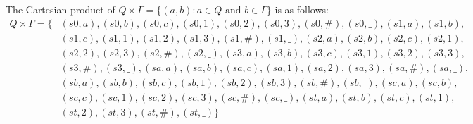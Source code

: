 \documentclass[12pt, a4paper, bibliography=totocnumbered]{report}
\begin{document}
{	The Cartesian product of $Q \times \Gamma = \{(a,b) : a \in Q \text{~and~} b \in \Gamma \}$ is as follows:
		\begin{equation}\label{eq:Q_times_Gamma}
		\begin{aligned}
		Q \times \Gamma = \{ & (s0,a),(s0,b),(s0,c),(s0,1),(s0,2),(s0,3),(s0,\#),(s0,\_),(s1,a),(s1,b),       \\
		                     & (s1,c),(s1,1),(s1,2), (s1,3),(s1,\#),(s1,\_),(s2,a),(s2,b),(s2,c),(s2,1),      \\
		                     & (s2,2),(s2,3),(s2,\#),(s2,\_),(s3,a),(s3,b), (s3,c),(s3,1),(s3,2),(s3,3),      \\
		                     & (s3,\#),(s3,\_),(sa,a),(sa,b),(sa,c),(sa,1),(sa,2),(sa,3),(sa,\#), (sa,\_),    \\
		                     & (sb,a),(sb,b),(sb,c),(sb,1),(sb,2),(sb,3),(sb,\#),(sb,\_),(sc,a),(sc,b),       \\
		                     & (sc,c),(sc,1),(sc,2), (sc,3),(sc,\#),(sc,\_),(st,a),(st,b),(st,c),(st,1),      \\
		                     & (st,2),(st,3),(st,\#),(st,\_) \}
		\end{aligned}
		\end{equation}
		
}
\end{document}
